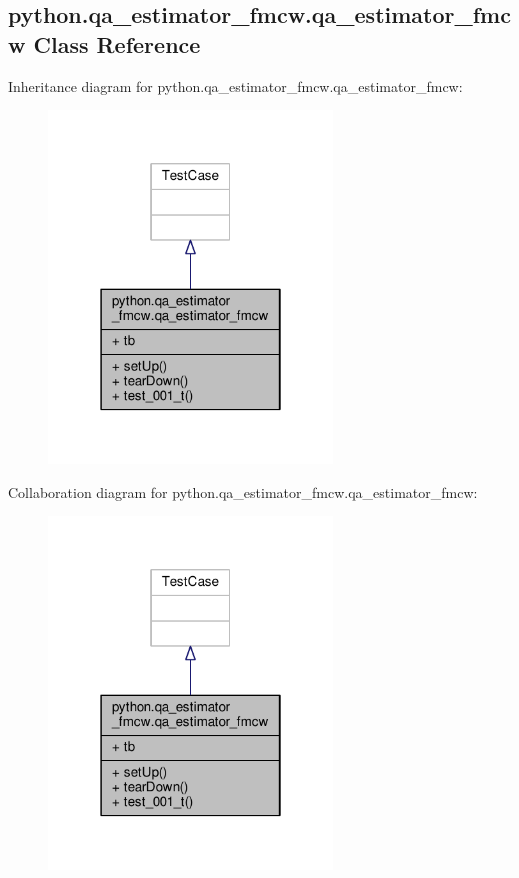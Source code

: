 \subsection{python.\+qa\+\_\+estimator\+\_\+fmcw.\+qa\+\_\+estimator\+\_\+fmcw Class Reference}
\label{classpython_1_1qa__estimator__fmcw_1_1qa__estimator__fmcw}


Inheritance diagram for python.\+qa\+\_\+estimator\+\_\+fmcw.\+qa\+\_\+estimator\+\_\+fmcw\+:
\nopagebreak
\begin{figure}[H]
\begin{center}
\leavevmode
\includegraphics[width=214pt]{df/d65/classpython_1_1qa__estimator__fmcw_1_1qa__estimator__fmcw__inherit__graph}
\end{center}
\end{figure}


Collaboration diagram for python.\+qa\+\_\+estimator\+\_\+fmcw.\+qa\+\_\+estimator\+\_\+fmcw\+:
\nopagebreak
\begin{figure}[H]
\begin{center}
\leavevmode
\includegraphics[width=214pt]{d3/dc3/classpython_1_1qa__estimator__fmcw_1_1qa__estimator__fmcw__coll__graph}
\end{center}
\end{figure}

